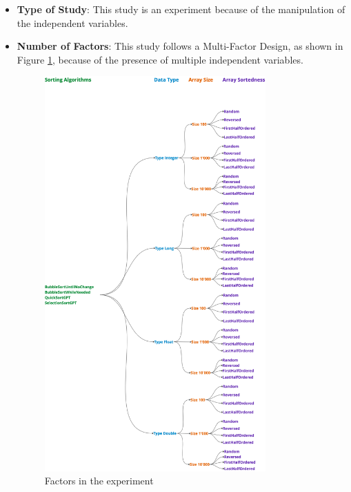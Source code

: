 \documentclass[unicode,11pt,a4paper,oneside,numbers=endperiod,openany]{scrartcl}
\begin{document}
    \begin{itemize}
        
        \item \textbf{Type of Study}: This study is an experiment because of the manipulation of the independent variables.
        \item \textbf{Number of Factors}: This study follows a Multi-Factor Design, as shown in Figure \ref{fig:factors}, because of the presence of multiple independent variables.
        
        \begin{figure}
            \centering
            \includegraphics[width=0.8\textwidth]{./fig/factors.png}
            \caption{Factors in the experiment}
            \label{fig:factors}
        \end{figure}

    \end{itemize}
\end{document}
